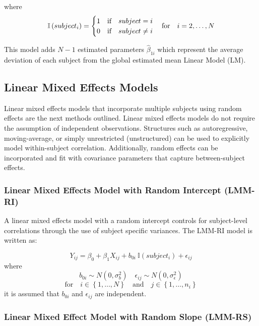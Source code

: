 \documentclass[12pt,]{article}
\begin{document}
where \[
\mathbb{I}\left(subject_{i} \right)=
\begin{cases}
1 & \mbox{if} \quad subject=i \\
0 & \mbox{if} \quad subject \neq i \\
\end{cases}
\quad \text{for} \quad i=2,\ldots,N\\
\]

This model adds \(N-1\) estimated parameters \(\hat{\beta}_{1i}\) which
represent the average deviation of each subject from the global
estimated mean Linear Model (LM).

\hypertarget{linear-mixed-effects-models}{%
\subsection{Linear Mixed Effects
Models}\label{linear-mixed-effects-models}}

Linear mixed effects models that incorporate multiple subjects using
random effects are the next methods outlined. Linear mixed effects
models do not require the assumption of independent observations.
Structures such as autoregressive, moving-average, or simply
unrestricted (unstructured) can be used to explicitly model
within-subject correlation. Additionally, random effects can be
incorporated and fit with covariance parameters that capture
between-subject effects.

\hypertarget{linear-mixed-effects-model-with-random-intercept-lmm-ri}{%
\subsubsection{Linear Mixed Effects Model with Random Intercept
(LMM-RI)}\label{linear-mixed-effects-model-with-random-intercept-lmm-ri}}

A linear mixed effects model with a random intercept controls for
subject-level correlations through the use of subject specific
variances. The LMM-RI model is written as:

\[Y_{ij} = \beta_{0} + \beta_{1} X_{ij} + b_{0i} \ \mathbb{I}\left(subject_{i}\right) + \epsilon_{ij}\]
where
\[b_{0i} \sim N\left(0, \sigma_{b}^{2} \right) \quad \epsilon_{ij} \sim N\left(0, \sigma_{\epsilon}^{2} \right)\]
\[\text{for} \quad i \in \left \{ 1,\ldots,N   \right \} \quad \text{and} \quad j \in \left \{ 1,\ldots,n_{i}   \right \}\]
it is assumed that \(b_{0i}\) and \(\epsilon_{ij}\) are independent.

\hypertarget{linear-mixed-effect-model-with-random-slope-lmm-rs}{%
\subsubsection{Linear Mixed Effect Model with Random Slope
(LMM-RS)}\label{linear-mixed-effect-model-with-random-slope-lmm-rs}}
\end{document}
